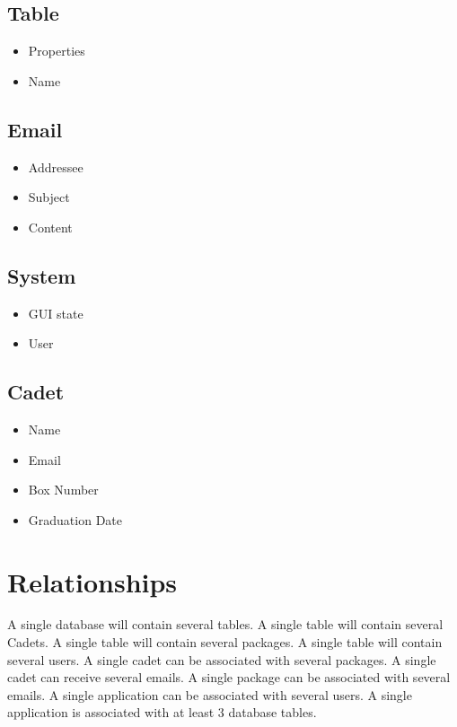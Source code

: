 \documentclass[11pt]{article}
\begin{document}
\subsection*{Table}
\label{sec:orgbdf2be0}
\begin{itemize}
\item Properties
\item Name
\end{itemize}
\subsection*{Email}
\label{sec:org097604f}
\begin{itemize}
\item Addressee
\item Subject
\item Content
\end{itemize}
\subsection*{System}
\label{sec:org437a5be}
\begin{itemize}
\item GUI state
\item User
\end{itemize}
\subsection*{Cadet}
\label{sec:orgbfe04b1}
\begin{itemize}
\item Name
\item Email
\item Box Number
\item Graduation Date
\end{itemize}

\section*{Relationships}
\label{sec:orgbd8f544}
A single database will contain several tables.
A single table will contain several Cadets.
A single table will contain several packages.
A single table will contain several users.
A single cadet can be associated with several packages.
A single cadet can receive several emails.
A single package can be associated with several emails.
A single application can be associated with several users.
A single application is associated with at least 3 database tables.
\end{document}
